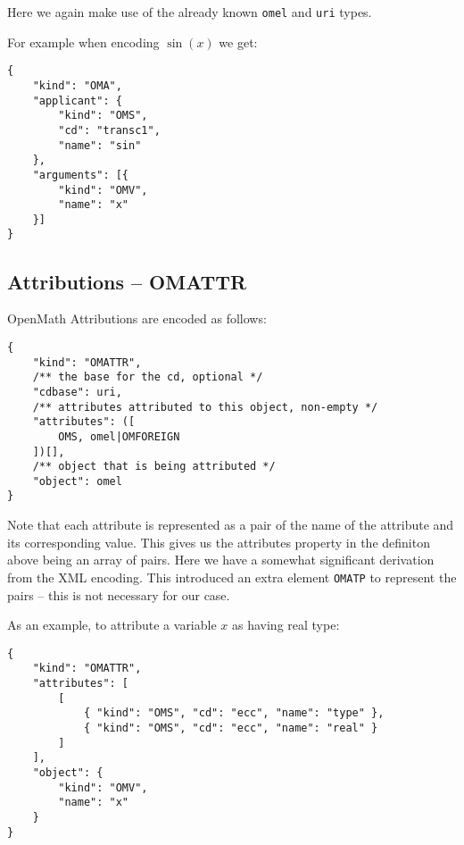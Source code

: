Here we again make use of the already known \texttt{omel} and \texttt{uri} types. 

For example when encoding $\sin(x)$ we get:
\\\begin{minipage}{\linewidth}
\begin{lstlisting}
{
    "kind": "OMA",
    "applicant": {
        "kind": "OMS",
        "cd": "transc1",
        "name": "sin"
    },
    "arguments": [{
        "kind": "OMV",
        "name": "x"
    }]
}
\end{lstlisting}\end{minipage}

\subsection{Attributions -- OMATTR}

OpenMath Attributions are encoded as follows:
\\\begin{minipage}{\linewidth}
\begin{lstlisting}
{
    "kind": "OMATTR", 
    /** the base for the cd, optional */
    "cdbase": uri, 
    /** attributes attributed to this object, non-empty */
    "attributes": ([
        OMS, omel|OMFOREIGN
    ])[],
    /** object that is being attributed */
    "object": omel
}
\end{lstlisting}\end{minipage}

Note that each attribute is represented as a pair of the name of the attribute and its corresponding value. 
This gives us the attributes property in the definiton above being an array of pairs. 
Here we have a somewhat significant derivation from the XML encoding. 
This introduced an extra element \texttt{OMATP} to represent the pairs -- this is not necessary for our case. 

As an example, to attribute a variable $x$ as having real type:
\\\begin{minipage}{\linewidth}
\begin{lstlisting}
{
    "kind": "OMATTR",
    "attributes": [
        [
            { "kind": "OMS", "cd": "ecc", "name": "type" },
            { "kind": "OMS", "cd": "ecc", "name": "real" }
        ]
    ],
    "object": {
        "kind": "OMV",
        "name": "x"
    }
}
\end{lstlisting}\end{minipage}

